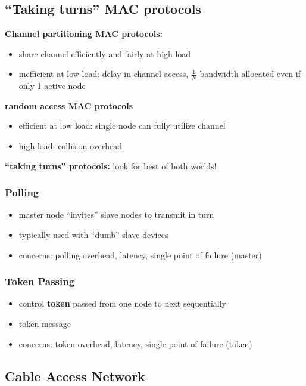 \subsection{``Taking turns'' MAC protocols}
\textbf{Channel partitioning MAC protocols:}
\begin{itemize}
	\item share channel efficiently and fairly at high load
	\item inefficient at low load: delay in channel access, $\frac{1}{N}$ bandwidth allocated even if only 1 active node
\end{itemize}
\textbf{random access MAC protocols}
\begin{itemize}
	\item efficient at low load: single node can fully utilize channel
	\item high load: collision overhead
\end{itemize}
\textbf{``taking turns'' protocols:} look for best of both worlds!
\subsubsection{Polling}\label{sec:polling}
\begin{itemize}
	\item master node ``invites'' slave nodes to transmit in turn
	\item typically used with ``dumb'' slave devices
	\item concerns: polling overhead, latency, single point of failure (master)
\end{itemize}
\subsubsection{Token Passing}\label{sec:token}
\begin{itemize}
	\item control \textbf{token} passed from one node to next sequentially
	\item token message
	\item concerns: token overhead, latency, single point of failure (token)
\end{itemize}

\subsection{Cable Access Network}
